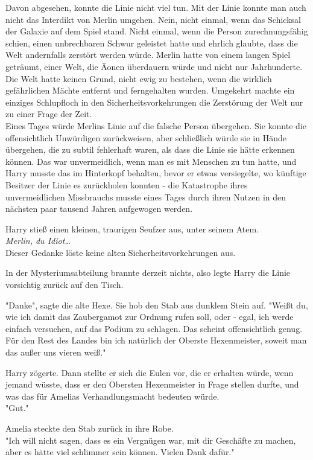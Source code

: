 {Davon abgesehen, konnte die Linie nicht viel tun. Mit der Linie konnte man auch nicht das Interdikt von Merlin umgehen. Nein, nicht einmal, wenn das Schicksal der Galaxie auf dem Spiel stand. Nicht einmal, wenn die Person zurechnungsfähig schien, einen unbrechbaren Schwur geleistet hatte und ehrlich glaubte, dass die Welt andernfalls zerstört werden würde. Merlin hatte von einem langen Spiel geträumt, einer Welt, die Äonen überdauern würde und nicht nur Jahrhunderte. Die Welt hatte keinen Grund, nicht ewig zu bestehen, wenn die wirklich gefährlichen Mächte entfernt und ferngehalten wurden. Umgekehrt machte ein einziges Schlupfloch in den Sicherheitsvorkehrungen die Zerstörung der Welt nur zu einer Frage der Zeit.\\ Eines Tages würde Merlins Linie auf die falsche Person übergehen. Sie konnte die offensichtlich Unwürdigen zurückweisen, aber schließlich würde sie in Hände übergehen, die zu subtil fehlerhaft waren, als dass die Linie sie hätte erkennen können. Das war unvermeidlich, wenn man es mit Menschen zu tun hatte, und Harry musste das im Hinterkopf behalten, bevor er etwas versiegelte, wo künftige Besitzer der Linie es zurückholen konnten - die Katastrophe ihres unvermeidlichen Missbrauchs musste eines Tages durch ihren Nutzen in den nächsten paar tausend Jahren aufgewogen werden.

Harry stieß einen kleinen, traurigen Seufzer aus, unter seinem Atem.\\ \emph{Merlin, du Idiot…}\\ Dieser Gedanke löste keine alten Sicherheitsvorkehrungen aus.

In der Mysteriumsabteilung brannte derzeit nichts, also legte Harry die Linie vorsichtig zurück auf den Tisch.

"Danke", sagte die alte Hexe. Sie hob den Stab aus dunklem Stein auf. "Weißt du, wie ich damit das Zaubergamot zur Ordnung rufen soll, oder - egal, ich werde einfach versuchen, auf das Podium zu schlagen. Das scheint offensichtlich genug. Für den Rest des Landes bin ich natürlich der Oberste Hexenmeister, soweit man das außer uns vieren weiß."

Harry zögerte. Dann stellte er sich die Eulen vor, die er erhalten würde, wenn jemand wüsste, dass er den Obersten Hexenmeister in Frage stellen durfte, und was das für Amelias Verhandlungsmacht bedeuten würde.\\ "Gut."

Amelia steckte den Stab zurück in ihre Robe.\\ "Ich will nicht sagen, dass es ein Vergnügen war, mit dir Geschäfte zu machen, aber es hätte viel schlimmer sein können. Vielen Dank dafür."

}
